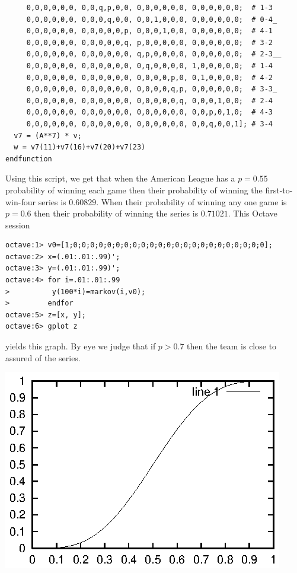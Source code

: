 \begin{exercises}
\begin{answer}
\begin{exparts}
\begin{lstlisting}
     0,0,0,0,0,0, 0,0,q,p,0,0, 0,0,0,0,0,0, 0,0,0,0,0,0;  # 1-3
     0,0,0,0,0,0, 0,0,0,q,0,0, 0,0,1,0,0,0, 0,0,0,0,0,0;  # 0-4_
     0,0,0,0,0,0, 0,0,0,0,0,p, 0,0,0,1,0,0, 0,0,0,0,0,0;  # 4-1
     0,0,0,0,0,0, 0,0,0,0,0,q, p,0,0,0,0,0, 0,0,0,0,0,0;  # 3-2
     0,0,0,0,0,0, 0,0,0,0,0,0, q,p,0,0,0,0, 0,0,0,0,0,0;  # 2-3__
     0,0,0,0,0,0, 0,0,0,0,0,0, 0,q,0,0,0,0, 1,0,0,0,0,0;  # 1-4
     0,0,0,0,0,0, 0,0,0,0,0,0, 0,0,0,0,p,0, 0,1,0,0,0,0;  # 4-2
     0,0,0,0,0,0, 0,0,0,0,0,0, 0,0,0,0,q,p, 0,0,0,0,0,0;  # 3-3_
     0,0,0,0,0,0, 0,0,0,0,0,0, 0,0,0,0,0,q, 0,0,0,1,0,0;  # 2-4
     0,0,0,0,0,0, 0,0,0,0,0,0, 0,0,0,0,0,0, 0,0,p,0,1,0;  # 4-3
     0,0,0,0,0,0, 0,0,0,0,0,0, 0,0,0,0,0,0, 0,0,q,0,0,1]; # 3-4
  v7 = (A**7) * v;
  w = v7(11)+v7(16)+v7(20)+v7(23)
endfunction
\end{lstlisting}
       Using this script, we get that when the American League has a
       $p=0.55$ probability of winning each game then their probability
       of winning the first-to-win-four series is $0.60829$.
       When their probability of winning any one game is $p=0.6$
       then their probability of winning the series is  
       $0.71021$.
      \partsitem This Octave session
\begin{lstlisting}
octave:1> v0=[1;0;0;0;0;0;0;0;0;0;0;0;0;0;0;0;0;0;0;0;0;0;0;0];
octave:2> x=(.01:.01:.99)';
octave:3> y=(.01:.01:.99)';
octave:4> for i=.01:.01:.99
>          y(100*i)=markov(i,v0);
>         endfor
octave:5> z=[x, y];
octave:6> gplot z
\end{lstlisting}
       yields this graph.
       By eye we judge that if $p>0.7$ then the team is close to assured
       of the series.
       \begin{center}
         \includegraphics{ws.eps}

\end{center}
\end{exparts}
\end{answer}
\end{exercises}
